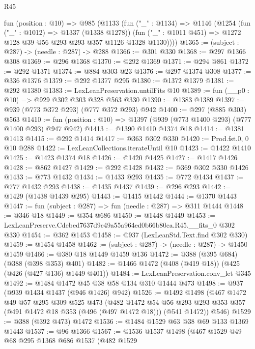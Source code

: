 \begin{lexlean}{R45}
\begin{coremodule}
  fun (position : @10) =>
  @985
    (@1133
      (fun ("_" : @1134) =>
      @1146
        (@1254
          (fun ("_" : @1012) => @1337 (@1338 @1278))
          (fun ("_" : @1011 @451) => @1272 @128 @39 @56 @293 @293 @357 @1126 @1328 @1130))))
@1365 := (subject : @287) -> (needle : @287) -> @288
@1366 := @301 @330
@1368 := @297 @1366 @308
@1369 := @296 @1368
@1370 := @292 @1369
@1371 := @294 @861
@1372 := @292 @1371
@1374 := @884 @303 @23
@1376 := @297 @1374 @308
@1377 := @336 @1376
@1379 := @292 @1377 @295
@1380 := @1372 @1379
@1381 := @292 @1380
@1383 := LexLeanPreservation.untilFits @10
@1389 := fun (__p0 : @10) => @929 @302 @303 @328 @563 @330
@1390 := @1383 @1389
@1397 := @939 (@773 @372 @293) (@777 @372 @293) @942
@1400 := @297 (@885 @303) @563
@1410 := fun (position : @10) => @1397 (@939 (@773 @1400 @293) (@777 @1400 @293) @947 @942)
@1413 := @1390 @1410 @1374 @18
@1414 := @1381 @1413
@1415 := @292 @1414
@1417 := @363 @302 @330
@1420 := Prod.fst.{0, 0} @10 @288
@1422 := LexLeanCollections.iterateUntil @10
@1423 := @1422 @1410
@1425 := @1423 @1374 @18
@1426 := @1420 @1425
@1427 := @1417 @1426
@1428 := @862 @1427
@1429 := @292 @1428
@1432 := @369 @302 @330 @1426
@1433 := @773 @1432
@1434 := @1433 @293
@1435 := @772 @1434
@1437 := @777 @1432 @293
@1438 := @1435 @1437
@1439 := @296 @293
@1442 := @1429 (@1438 @1439 @295)
@1443 := @1415 @1442
@1444 := @1370 @1443
@1447 := fun (subject : @287) => fun (needle : @287) => @311 @1444
@1448 := @346 @18
@1449 := @354 @686
@1450 := @1448 @1449
@1453 := LexLeanPreserve.Cdebed7637d9c49a55a964ed0b66b80ca.R45.__fits_0 @302 @330
@1454 := @362 @1453
@1458 := @937 (LexLeanStd.Text.find @302 @330)
@1459 := @1454 @1458
@1462 := (subject : @287) -> (needle : @287) -> @1450 @1459
@1466 := @380 @18 @1449 @1459 @136
@1472 := @388 (@395 @684) (@388 (@398 @353) @401)
@1482 := @1466 @1472 (@408 (@419 @18)) (@425 (@426 (@427 @136) @1449 @401))
@1484 := LexLeanPreservation.conv_let @345
@1492 := @1484 @1472 @45 @38 @58 @134 @310 @1444 @473
@1498 := @937 (@939 @1434 @1437 (@946 @1426) @942)
@1526 := @1492
    @1498
    (@467
      @1472
      @49
      @57
      @295
      @309
      @525
      @473
      (@482
        @1472
        @54
        @56
        @293
        @293
        @353
        @357
        (@491 @1472 @18 @353 (@496 (@497 @1472 @18)))
        (@541 @1472))
      @546)
@1529 := @388 (@392 @473) @1472
@1536 := @1484 @1529 @63 @38 @69 @133 @1369 @1443
@1537 := @96 @1366
@1567 := @1536
    @1537
    @1498
    (@467
      @1529
      @49
      @68
      @295
      @1368
      @686
      @1537
      (@482
        @1529

\end{coremodule}
\end{lexlean}
